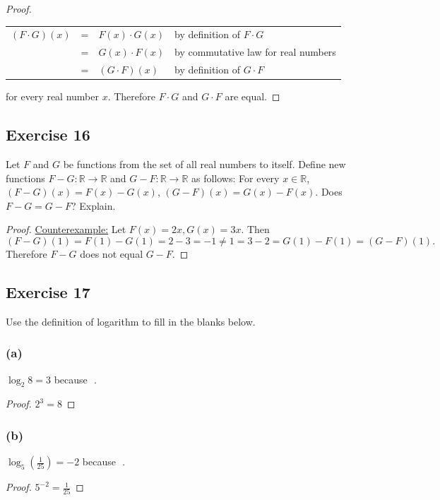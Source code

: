 \documentclass[14pt]{extarticle}
\newcommand{\dps}{\displaystyle}
\newcommand{\fbl}{\underline{\hspace{1cm}}\,\,}
\newcommand{\R}{\mathbb{R}}
\newcommand{\cy}{\color{cyan}}
\begin{document}
\begin{proof}
\begin{tabular}{rcll}
\((F \cdot G)(x)\) & = & \(F(x) \cdot G(x)\) & {\cy by definition of $F \cdot G$} \\
& = & \(G(x) \cdot F(x)\) & {\cy by commutative law for real numbers} \\
& = & \((G \cdot F)(x)\) & {\cy by definition of $G \cdot F$}
\end{tabular}

for every real number $x$. Therefore $F\cdot G$ and $G \cdot F$ are equal.
\end{proof}

\subsection{Exercise 16}
Let $F$ and $G$ be functions from the set of all real numbers to itself. Define new functions 
\(F - G: \R \to \R\) and \(G - F: \R \to \R\) as follows: For every \(x \in \R\), \((F - G)(x) = F(x) - G(x)\), 
\((G - F)(x) = G(x) - F(x)\). Does $F - G = G - F$? Explain.

\begin{proof}
\underline{Counterexample:} Let \(F(x) = 2x, G(x) = 3x\). 
Then 
\[
(F-G)(1) = F(1) - G(1) = 2 - 3 = -1 \neq 1 = 3 - 2 = G(1) - F(1) = (G-F)(1).
\] 
Therefore $F - G$ does not equal $G - F$.
\end{proof}

\subsection{Exercise 17}
Use the definition of logarithm to fill in the blanks below.

\subsubsection{(a)}
\(\log_{2} 8 = 3\) because \fbl.

\begin{proof}
\(2^3 = 8\)
\end{proof}

\subsubsection{(b)}
\(\log_{5}(\frac{1}{25}) = -2\) because \fbl.

\begin{proof}
\(\dps 5^{-2} = \frac{1}{25}\)
\end{proof}
\end{document}
